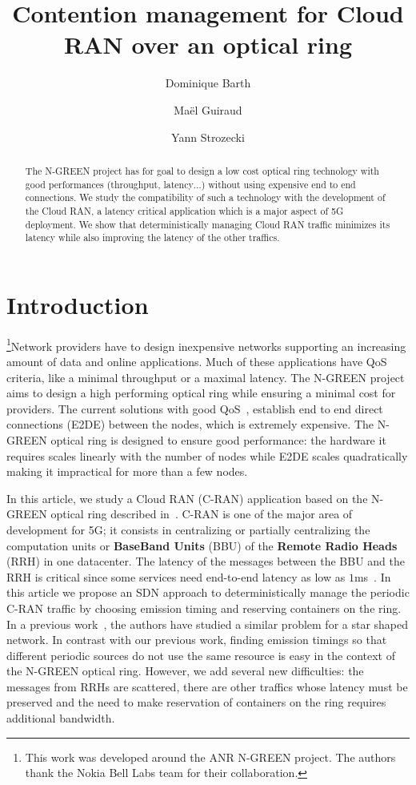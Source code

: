 \documentclass[10pt, conference, letterpaper]{IEEEtran}
\title{Contention management for Cloud RAN over an optical ring}
\author[1]{Dominique Barth}
\author[1,2]{Ma\"el Guiraud}
\author[1]{Yann Strozecki}
\affil[1]{David Laboratory, UVSQ}
\affil[2]{Nokia Bell Labs France}
\begin{document}
\maketitle


\begin{abstract}
The N-GREEN project has for goal to design a low cost optical ring technology with good performances (throughput, latency$\dots$) without using expensive end to end connections. We study the compatibility of such a technology with the development of the Cloud RAN, a latency critical application which is a major aspect of 5G deployment. We show that deterministically managing Cloud RAN traffic minimizes its latency while also improving the latency of the other traffics. 

\end{abstract}


\section{Introduction}

\footnote{This work was developed around the ANR N-GREEN project. The authors thank the Nokia Bell Labs team for their collaboration.}Network providers have to design inexpensive networks supporting an increasing amount of data and online applications. Much of these applications have QoS criteria, like a minimal throughput or a maximal latency. The N-GREEN project aims to design a high performing optical ring while ensuring a minimal cost for providers. The current solutions with good QoS~\cite{pizzinat2015things,tayq2017real}, establish end to end direct connections (E2DE) between the nodes, which is extremely expensive. The N-GREEN optical ring is designed to ensure good performance: the hardware it requires scales linearly with the number of nodes while E2DE scales quadratically making it impractical for more than a few nodes.

In this article, we study a Cloud RAN (C-RAN) application based on the N-GREEN optical ring described in~\cite{ngreenarchitecture,uscumlicscalable}. C-RAN is one of the major area of development for 5G; it consists in centralizing or partially centralizing the computation units or {\bf BaseBand Units} (BBU) of the {\bf Remote Radio Heads} (RRH) in one datacenter. The latency of the messages between the BBU and the RRH is critical since some services need end-to-end latency as low as $1$ms~\cite{3gpp5g,boccardi2014five}. In this article we propose an SDN approach to deterministically manage the periodic C-RAN traffic by choosing emission timing and reserving containers on the ring. In a previous work~\cite{dominique2018deterministic}, the authors have studied a similar problem for a star shaped network. In contrast with our previous work, finding emission timings so that different periodic sources do not use the same resource is easy in the context of the N-GREEN optical ring. However, we add several new difficulties: the messages from RRHs are scattered, there are other traffics whose latency must be preserved and the need to make reservation of containers on the ring requires additional bandwidth.
\end{document}
